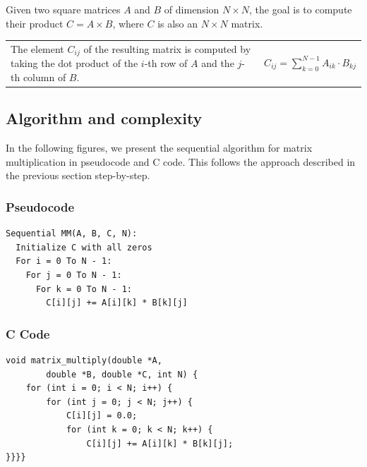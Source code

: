 \documentclass[
  12pt,
]{article}
\begin{document}
Given two square matrices \(A\) and \(B\) of dimension \(N \times N\),
the goal is to compute their product \(C = A \times B\), where \(C\) is
also an \(N \times N\) matrix.

\begin{table}[h]
\centering
\begin{tabular}{m{} m{}}
The element $C_{ij}$ of the resulting matrix is computed by taking the dot product of the $i$-th row of $A$ and the $j$-th column of $B$. & 
$C_{ij} = \sum_{k=0}^{N-1} A_{ik} \cdot B_{kj}$
\end{tabular}
\end{table}

\subsection{Algorithm and complexity}\label{algorithm-and-complexity}

In the following figures, we present the sequential algorithm for matrix
multiplication in pseudocode and C code. This follows the approach
described in the previous section step-by-step.

\begin{center}
\begin{minipage}[t]{0.46\textwidth}
\subsubsection*{Pseudocode}
\begin{small}
\begin{verbatim}
Sequential MM(A, B, C, N):
  Initialize C with all zeros
  For i = 0 To N - 1:
    For j = 0 To N - 1:
      For k = 0 To N - 1:
        C[i][j] += A[i][k] * B[k][j]
\end{verbatim}
\end{small}
\end{minipage}
\hfill
\begin{minipage}[t]{0.48\textwidth}
\subsubsection*{C Code}
\begin{small}
\begin{verbatim}
void matrix_multiply(double *A, 
        double *B, double *C, int N) {
    for (int i = 0; i < N; i++) {
        for (int j = 0; j < N; j++) {
            C[i][j] = 0.0;
            for (int k = 0; k < N; k++) {
                C[i][j] += A[i][k] * B[k][j];
}}}}
\end{verbatim}
\end{small}
\end{minipage}
\end{center}
\end{document}
